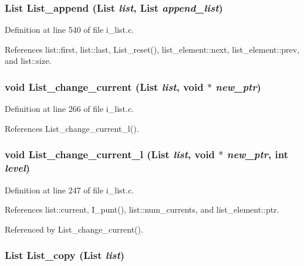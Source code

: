 \subsubsection{\setlength{\rightskip}{0pt plus 5cm}\bf{List} List\_\-append (\bf{List} {\em list}, \bf{List} {\em append\_\-list})}\label{i__list_8c_9b1bc5db9e5edd6e1220a16eeebaf6a3}




Definition at line 540 of file i\_\-list.c.

References list::first, list::last, List\_\-reset(), list\_\-element::next, list\_\-element::prev, and list::size.
\subsubsection{\setlength{\rightskip}{0pt plus 5cm}void List\_\-change\_\-current (\bf{List} {\em list}, void $\ast$ {\em new\_\-ptr})}\label{i__list_8c_23fe1f21d2824722440364a8af9cdc97}




Definition at line 266 of file i\_\-list.c.

References List\_\-change\_\-current\_\-l().
\subsubsection{\setlength{\rightskip}{0pt plus 5cm}void List\_\-change\_\-current\_\-l (\bf{List} {\em list}, void $\ast$ {\em new\_\-ptr}, int {\em level})}\label{i__list_8c_d63e9aa3b9ab428f78542bd99c1c6bc8}




Definition at line 247 of file i\_\-list.c.

References list::current, I\_\-punt(), list::num\_\-currents, and list\_\-element::ptr.

Referenced by List\_\-change\_\-current().
\subsubsection{\setlength{\rightskip}{0pt plus 5cm}\bf{List} List\_\-copy (\bf{List} {\em list})}\label{i__list_8c_7f627f281d7c2a5b137970ab15ec683d}




